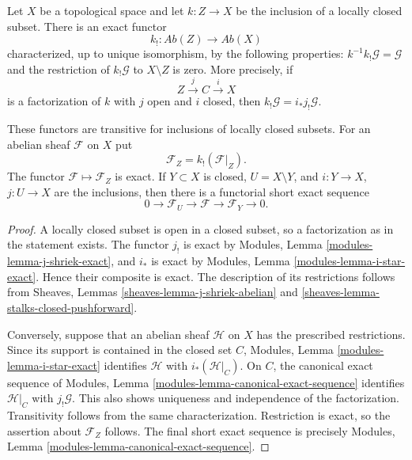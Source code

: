 \begin{lemma}
\label{lemma-extension-by-zero-locally-closed}
\begin{reference}
\cite[Chapter III, \S 3.5, p. 166]{Tohoku}
\end{reference}
Let $X$ be a topological space and let $k : Z \to X$ be the inclusion of
a locally closed subset. There is an exact functor
$$
k_! : \textit{Ab}(Z) \longrightarrow \textit{Ab}(X)
$$
characterized, up to unique isomorphism, by the following properties:
$k^{-1}k_!\mathcal{G}=\mathcal{G}$ and the restriction of
$k_!\mathcal{G}$ to $X \setminus Z$ is zero. More precisely, if
$$
Z \xrightarrow{j} C \xrightarrow{i} X
$$
is a factorization of $k$ with $j$ open and $i$ closed, then
$k_!\mathcal{G}=i_*j_!\mathcal{G}$.

These functors are transitive for inclusions of locally closed subsets.
For an abelian sheaf $\mathcal{F}$ on $X$ put
$$
\mathcal{F}_Z=k_!(\mathcal{F}|_Z).
$$
The functor $\mathcal{F}\mapsto\mathcal{F}_Z$ is exact. If $Y\subset X$
is closed, $U=X\setminus Y$, and $i:Y\to X$, $j:U\to X$ are the
inclusions, then there is a functorial short exact sequence
$$
0\longrightarrow \mathcal{F}_U\longrightarrow \mathcal{F}
\longrightarrow \mathcal{F}_Y\longrightarrow 0.
$$
\end{lemma}

\begin{proof}
A locally closed subset is open in a closed subset, so a factorization as
in the statement exists. The functor $j_!$ is exact by Modules, Lemma
\ref{modules-lemma-j-shriek-exact}, and $i_*$ is exact by Modules, Lemma
\ref{modules-lemma-i-star-exact}. Hence their composite is exact. The
description of its restrictions follows from Sheaves, Lemmas
\ref{sheaves-lemma-j-shriek-abelian} and
\ref{sheaves-lemma-stalks-closed-pushforward}.

Conversely, suppose that an abelian sheaf $\mathcal{H}$ on $X$ has the
prescribed restrictions. Since its support is contained in the closed set
$C$, Modules, Lemma \ref{modules-lemma-i-star-exact} identifies
$\mathcal{H}$ with $i_*(\mathcal{H}|_C)$. On $C$, the canonical exact
sequence of Modules, Lemma
\ref{modules-lemma-canonical-exact-sequence} identifies
$\mathcal{H}|_C$ with $j_!\mathcal{G}$. This also shows uniqueness and
independence of the factorization. Transitivity follows from the same
characterization. Restriction is exact, so the assertion about
$\mathcal{F}_Z$ follows. The final short exact sequence is precisely
Modules, Lemma \ref{modules-lemma-canonical-exact-sequence}.
\end{proof}

